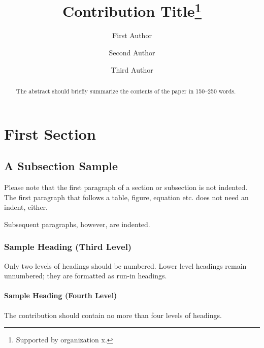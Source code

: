 \documentclass[runningheads]{llncs}
\begin{document}
%
\title{Contribution Title\thanks{Supported by organization x.}}
%
%
\author{First Author \and
Second Author \and
Third Author}
%
%
%
\maketitle              %
%
\begin{abstract}
The abstract should briefly summarize the contents of the paper in
150--250 words.

\end{abstract}
%
%
%
\section{First Section}
\subsection{A Subsection Sample}
Please note that the first paragraph of a section or subsection is
not indented. The first paragraph that follows a table, figure,
equation etc. does not need an indent, either.

Subsequent paragraphs, however, are indented.

\subsubsection{Sample Heading (Third Level)} Only two levels of
headings should be numbered. Lower level headings remain unnumbered;
they are formatted as run-in headings.

\paragraph{Sample Heading (Fourth Level)}
The contribution should contain no more than four levels of headings.
\end{document}
